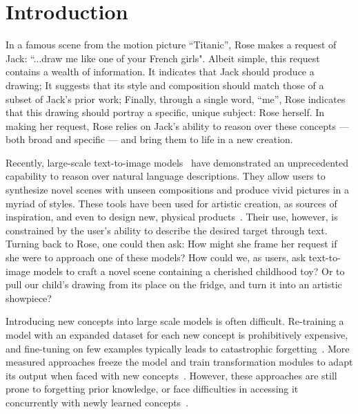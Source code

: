 \vspace{-5pt}


\section{Introduction}

In a famous scene from the motion picture ``Titanic'', Rose makes a request of Jack: ``...draw me like one of your French girls".
Albeit simple, this request contains a wealth of information. It indicates that Jack should produce a drawing; It suggests that its style and composition should match those of a subset of Jack's prior work; Finally, through a single word, ``me'', Rose indicates that this drawing should portray a specific, unique subject: Rose herself.
In making her request, Rose relies on Jack's ability to reason over these concepts --- both broad and specific --- and bring them to life in a new creation.

Recently, large-scale text-to-image models~\citep{rombach2021highresolution,ramesh2021zero,ramesh2022hierarchical,nichol2021glide,yu2022scaling,saharia2022photorealistic} have demonstrated an unprecedented capability to reason over natural language descriptions. They allow users to synthesize novel scenes with unseen compositions and produce vivid pictures in a myriad of styles. These tools have been used for artistic creation, as sources of inspiration, and even to design new, physical products~\citep{yacoubian2022avocadobag}. Their use, however, is constrained by the user's ability to describe the desired target through text. Turning back to Rose, one could then ask: How might she frame her request if she were to approach one of these models? How could we, as users, ask text-to-image models to craft a novel scene containing a cherished childhood toy? Or to pull our child's drawing from its place on the fridge, and turn it into an artistic showpiece? 

Introducing new concepts into large scale models is often difficult. Re-training a model with an expanded dataset for each new concept is prohibitively expensive, and fine-tuning on few examples typically leads to catastrophic forgetting~\citep{ding2022don,Li2022}. More measured approaches freeze the model and train transformation modules to adapt its output when faced with new concepts~\citep{zhou2021learning,gao2021clip,skantze2022collie}. However, these approaches are still prone to forgetting prior knowledge, or face difficulties in accessing it concurrently with newly learned concepts~\citep{kumar2022fine,cohen2022my}.








